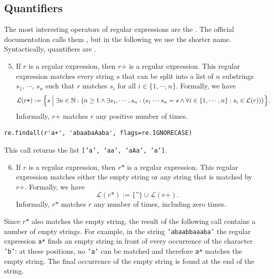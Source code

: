 \subsection{Quantifiers}
The most interesting operators of regular expressions are the .  The official documentation
calls them , but in the following we use the shorter name.  Syntactically,
quantifiers are .
\begin{enumerate}
\setcounter{enumi}{4}
\item If $r$ is a regular expression, then $r\texttt{+}$ is a regular expression.  This regular expression
      matches every string $s$ that can be split into a list of $n$ substrings $s_1$, $\cdots$, $s_n$ such that
      $r$ matches $s_i$ for all $i \in \{1,\cdots,n\}$.  Formally, we have
      $$\mathcal{L}(r\texttt{+}) := 
        \Bigl\{ s \Bigm| \exists n \in \mathbb{N}: \bigl(n \geq 1 \wedge 
                \exists s_1,\cdots,s_n : (s_1 \cdots s_n = s \wedge 
                 \forall i \in \{1,\cdots, n\}:  s_i \in \mathcal{L}(r))\bigr)  
        \Bigr\}.
      $$
      Informally, $r\texttt{+}$ matches $r$ any positive number of times.
\end{enumerate}

\begin{verbatim}
re.findall(r'a+', 'abaabaAaba', flags=re.IGNORECASE)
\end{verbatim}

\noindent
This call returns the list \texttt{['a', 'aa', 'aAa', 'a']}.

\begin{enumerate}
\setcounter{enumi}{5}
\item If $r$ is a regular expression, then $r\texttt{*}$ is a regular expression.  This regular expression
      matches either the empty string or any string that is matched by $r\texttt{+}$.  Formally, we have
      $$\mathcal{L}(r\texttt{*}) := \bigl\{ \texttt{''} \bigr\} \cup \mathcal{L}(r\texttt{+}).$$
      Informally, $r\texttt{*}$ matches $r$ any number of times, including zero times.
\end{enumerate}
Since $r\texttt{*}$ also matches the empty string, the result of the following call contains a number of empty
strings.  For example, in the string \texttt{'abaabbaaaba'} the regular expression \texttt{a*} finds an empty
string in front of every occurrence of the character \texttt{'b'}: at these positions, no \texttt{'a'} can be
matched and therefore \texttt{a*} matches the empty string.  The final occurrence of the empty string is found at
the end of the string.

